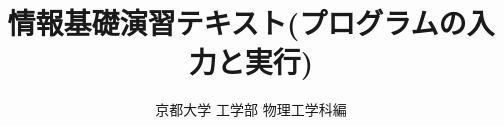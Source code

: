 \documentclass[a4j]{jsbook}
\begin{document}
\title{情報基礎演習テキスト(プログラムの入力と実行)}
\author{京都大学 工学部 物理工学科編}
\date{}
\maketitle

%



%





\begin{appendix}

\end{appendix}
\end{document}
